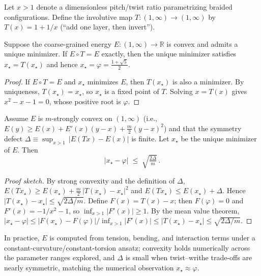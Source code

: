 Let $x>1$ denote a dimensionless pitch/twist ratio parametrizing braided configurations.
Define the involutive map $T:(1,\infty)\to(1,\infty)$ by $T(x)=1+1/x$ (``add one layer, then invert'').

\begin{lemma}
Suppose the coarse-grained energy $E:(1,\infty)\to\mathbb{R}$ is convex and admits a unique minimizer.
If $E\circ T = E$ exactly, then the unique minimizer satisfies $x_\star = T(x_\star)$ and hence $x_\star=\varphi=\frac{1+\sqrt{5}}{2}$.
\end{lemma}

\begin{proof}
If $E\circ T = E$ and $x_\star$ minimizes $E$, then $T(x_\star)$ is also a minimizer.
By uniqueness, $T(x_\star)=x_\star$, so $x_\star$ is a fixed point of $T$.
Solving $x=T(x)$ gives $x^2-x-1=0$, whose positive root is $\varphi$.
\end{proof}

\begin{corollary}
Assume $E$ is $m$-strongly convex on $(1,\infty)$ (i.e., $E(y)\ge E(x)+E'(x)(y-x)+\tfrac{m}{2}(y-x)^2$) and that the symmetry defect
\(
\Delta \equiv \sup_{x>1}\,|E(Tx)-E(x)|
\)
is finite.
Let $x_\star$ be the unique minimizer of $E$.
Then
\begin{equation}
|x_\star - \varphi| \;\le\; \sqrt{\tfrac{2\Delta}{m}}\,.
\end{equation}
\end{corollary}

\begin{proof}[Proof sketch]
By strong convexity and the definition of $\Delta$,
\(
E(Tx_\star) \ge E(x_\star) + \tfrac{m}{2}\,|T(x_\star)-x_\star|^2
\)
and
\(
E(Tx_\star) \le E(x_\star) + \Delta
\).
Hence $|T(x_\star)-x_\star| \le \sqrt{2\Delta/m}$.
Define $F(x)=T(x)-x$; then $F(\varphi)=0$ and $F'(x)= -1/x^2 - 1$, so $\inf_{x>1}|F'(x)|\ge 1$.
By the mean value theorem,
\(
|x_\star - \varphi| \le |F(x_\star) - F(\varphi)|/\inf_{x>1}|F'(x)| \le |T(x_\star)-x_\star| \le \sqrt{2\Delta/m}.
\)
\end{proof}

\noindent
In practice, $E$ is computed from tension, bending, and interaction terms under a constant-curvature/constant-torsion ansatz; convexity holds numerically across the parameter ranges explored, and $\Delta$ is small when twist--writhe trade-offs are nearly symmetric, matching the numerical observation $x_\star \approx \varphi$.

